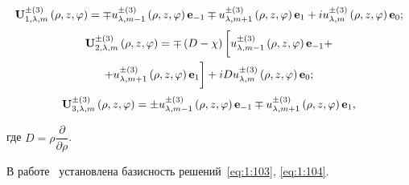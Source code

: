 \begin{equation}\label{eq:1:106}
{\bf{U}}_{1,\lambda ,m}^{ \pm (3)}\left( {\rho ,z,\varphi } \right) =  \mp u_{\lambda ,m - 1}^{ \pm (3)}\left( {\rho ,z,\varphi } \right){{\bf{e}}_{ - 1}} \mp u_{\lambda ,m + 1}^{ \pm (3)}\left( {\rho ,z,\varphi } \right){{\bf{e}}_1} +iu_{\lambda ,m}^{ \pm (3)}\left( {\rho ,z,\varphi } \right){{\bf{e}}_0};
\end{equation}
\begin{multline}\label{eq:1:107}
{\bf{U}}_{2,\lambda ,m}^{ \pm (3)}\left( {\rho ,z,\varphi } \right) =  \mp \left( {D - \chi } \right)\bigg[u_{\lambda ,m - 1}^{ \pm (3)}\left( {\rho ,z,\varphi } \right){{\bf{e}}_{ - 1}} + \\
+ u_{\lambda ,m + 1}^{ \pm (3)}\left( {\rho ,z,\varphi } \right){{\bf{e}}_1} \bigg] + iDu_{\lambda ,m}^{ \pm (3)}\left( {\rho ,z,\varphi } \right){{\bf{e}}_0};
\end{multline}
\begin{equation}\label{eq:1:108}
{\bf{U}}_{3,\lambda ,m}^{ \pm (3)}\left( {\rho ,z,\varphi } \right) =  \pm u_{\lambda ,m - 1}^{ \pm (3)}\left( {\rho ,z,\varphi } \right){{\bf{e}}_{ - 1}} \mp u_{\lambda ,m + 1}^{ \pm (3)}\left( {\rho ,z,\varphi } \right){{\bf{e}}_1},
\end{equation}

\noindent где $D = \rho \dfrac{\partial }{{\partial \rho }}$.

В работе~\cite{Nikolaev1998} установлена базисность решений~\eqref{eq:1:103}, \eqref{eq:1:104}.

